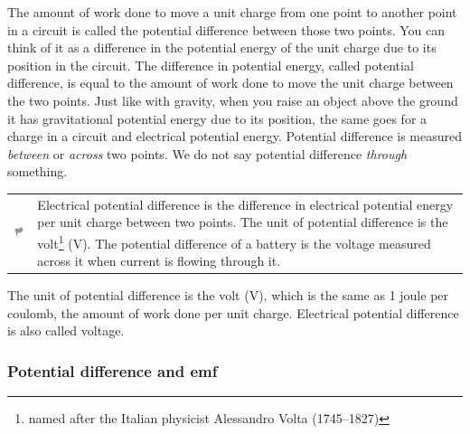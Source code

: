         \label{m38772*id63957}The amount of work done to move a unit charge from one point to another point in a circuit is called the potential difference between those two points. You can think of it as a difference in the potential energy of the unit charge due to its position in the circuit. The difference in potential energy, called potential difference, is equal to the amount of work done to move the unit charge between the two points. Just like with gravity, when you raise an object above the ground it has gravitational potential energy due to its position, the same goes for a charge in a circuit and electrical potential energy. Potential difference is measured \textsl{between} or \textsl{across} two points. We do not say potential difference \textsl{through} something.\par 
\label{m38772*fhsst!!!underscore!!!id409}\begin{definition}
	  \begin{tabular*}{15 cm}{m{15 mm}m{}}
	\hspace*{-50pt}  \includegraphics[width=0.5in]{col11305.imgs/psflag2.png}   & \Definition{   \label{id2479718}\textbf{ Potential Difference }} { \label{m38772*meaningfhsst!!!underscore!!!id409}
        \label{m38772*id63970}Electrical potential difference is the difference in electrical potential energy per unit charge between two points. The unit of potential difference is the volt\label{m38772*uid41}\footnote{named after the Italian physicist Alessandro Volta (1745--1827)} (V). 
The potential difference of a battery is the voltage measured across it when current is flowing through it.
\par 
         } 
      \end{tabular*}
      \end{definition}

        \label{m38772*id63994}The unit of potential difference is the volt (V), which is the same as 1 joule per coulomb, the amount of work done per unit charge. Electrical potential difference is also called voltage.\par 
      

      \label{m38772*s1}
            \subsubsection{ Potential difference and emf}
            \nopagebreak
            

